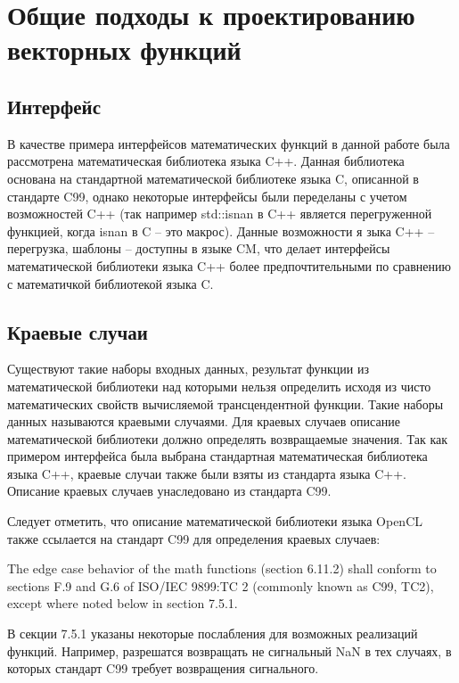 
\chapter{Общие подходы к проектированию векторных функций}

\section{Интерфейс}

В качестве примера интерфейсов математических функций в данной работе была рассмотрена математическая библиотека языка C++\cite{c++11}.
Данная библиотека основана на стандартной математической библиотеке языка C, описанной в стандарте C99\cite{c99}, однако некоторые интерфейсы были переделаны с учетом возможностей C++ (так например std::isnan в C++ является перегруженной функцией, когда isnan в C -- это макрос).
Данные возможности я зыка C++ -- перегрузка, шаблоны -- доступны в языке CM, что делает интерфейсы математической библиотеки языка C++ более предпочтительными по сравнению с математичкой библиотекой языка C.

\section{Краевые случаи}

Существуют такие наборы входных данных, результат функции из математической библиотеки над которыми нельзя определить исходя из чисто математических свойств вычисляемой трансцендентной функции.
Такие наборы данных называются краевыми случаями.
Для краевых случаев описание математической библиотеки должно определять возвращаемые значения.
Так как примером интерфейса была выбрана стандартная математическая библиотека языка C++, краевые случаи также были взяты из стандарта языка C++\cite{c++11}.
Описание краевых случаев унаследовано из стандарта C99\cite{c99}.

Следует отметить, что описание математической библиотеки языка OpenCL\cite{opencl11} также ссылается на стандарт C99 для определения краевых случаев:

\begin{displayquote}
The edge case behavior of the math functions (section 6.11.2) shall conform to sections F.9 and
G.6 of ISO/IEC 9899:TC 2 (commonly known as C99, TC2), except where noted below in
section 7.5.1.
\end{displayquote}

В секции 7.5.1 указаны некоторые послабления для возможных реализаций функций.
Например, разрешатся возвращать не сигнальный NaN в тех случаях, в которых стандарт C99 требует возвращения сигнального.

